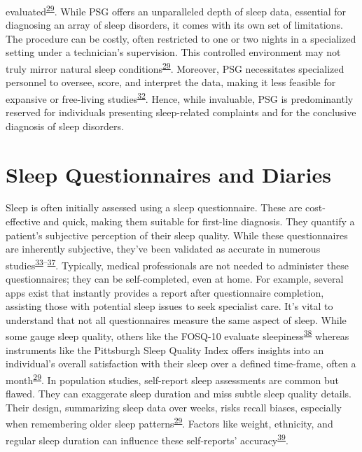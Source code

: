 \documentclass[
  9pt,
]{scrbook}
\begin{document}
evaluated\textsuperscript{\protect\hyperlink{ref-sadeh_2015}{29}}. While
PSG offers an unparalleled depth of sleep data, essential for diagnosing
an array of sleep disorders, it comes with its own set of limitations.
The procedure can be costly, often restricted to one or two nights in a
specialized setting under a technician's supervision. This controlled
environment may not truly mirror natural sleep
conditions\textsuperscript{\protect\hyperlink{ref-sadeh_2015}{29}}.
Moreover, PSG necessitates specialized personnel to oversee, score, and
interpret the data, making it less feasible for expansive or free-living
studies\textsuperscript{\protect\hyperlink{ref-girschik_validation_2012}{32}}.
Hence, while invaluable, PSG is predominantly reserved for individuals
presenting sleep-related complaints and for the conclusive diagnosis of
sleep disorders.

\hypertarget{sleep-questionnaires-and-diaries}{%
\section{Sleep Questionnaires and
Diaries}\label{sleep-questionnaires-and-diaries}}

Sleep is often initially assessed using a sleep questionnaire. These are
cost-effective and quick, making them suitable for first-line diagnosis.
They quantify a patient's subjective perception of their sleep quality.
While these questionnaires are inherently subjective, they've been
validated as accurate in numerous
studies\textsuperscript{\protect\hyperlink{ref-silva_2011}{33}--\protect\hyperlink{ref-pataka_2014}{37}}.
Typically, medical professionals are not needed to administer these
questionnaires; they can be self-completed, even at home. For example,
several apps exist that instantly provides a report after questionnaire
completion, assisting those with potential sleep issues to seek
specialist care. It's vital to understand that not all questionnaires
measure the same aspect of sleep. While some gauge sleep quality, others
like the FOSQ-10 evaluate
sleepiness\textsuperscript{\protect\hyperlink{ref-chasens_2009}{38}}
whereas instruments like the Pittsburgh Sleep Quality Index offers
insights into an individual's overall satisfaction with their sleep over
a defined time-frame, often a
month\textsuperscript{\protect\hyperlink{ref-sadeh_2015}{29}}. In
population studies, self-report sleep assessments are common but flawed.
They can exaggerate sleep duration and miss subtle sleep quality
details. Their design, summarizing sleep data over weeks, risks recall
biases, especially when remembering older sleep
patterns\textsuperscript{\protect\hyperlink{ref-sadeh_2015}{29}}.
Factors like weight, ethnicity, and regular sleep duration can influence
these self-reports'
accuracy\textsuperscript{\protect\hyperlink{ref-lauderdale_2008}{39}}.
\end{document}
